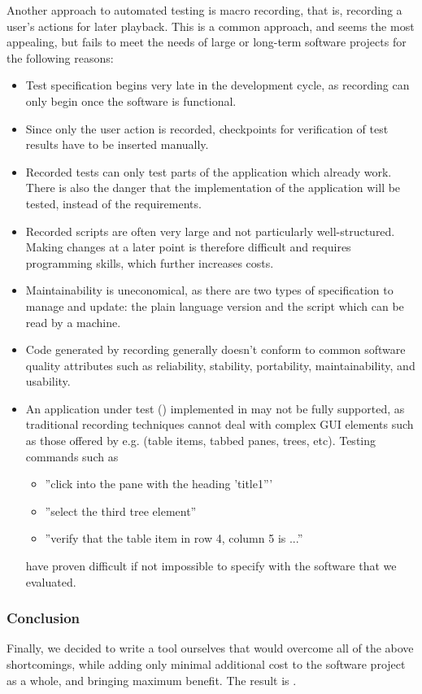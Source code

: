 Another approach to automated testing is macro recording, that is, 
recording a user's actions for later playback.
This is a common approach, and seems the most appealing,
 but fails to meet the needs of large or long-term software projects 
for the following reasons:
\begin{itemize}
\item Test specification begins very late in the development cycle,
 as recording can only begin once the software is functional. 
\item Since only the user action is recorded, checkpoints for verification
of test results have to be inserted manually.
\item Recorded tests can only test parts of the application which already work. There is also the danger that the implementation of the application will be tested, instead of the requirements. 
\item Recorded scripts are often very large and not particularly 
well-structured. Making changes at a later point is therefore 
difficult and requires programming skills, which further increases costs. 
\item Maintainability is uneconomical, as there are two types of specification
to manage and update: the plain language version and the script which can be 
read by a machine. 
\item Code generated by recording generally doesn't conform to
 common software quality attributes such as reliability, stability, 
portability, maintainability, and usability.
\item An application under test (\gdaut) implemented in  may not be fully supported, as
traditional recording techniques cannot deal with complex
 GUI elements such as those offered 
by e.g.  (table items, tabbed panes, trees, etc). Testing commands such as
  \begin{itemize}
    \item{''click into the pane with the heading 'title1'''}
    \item{''select the third tree element''}
    \item{''verify that the table item in row 4, column 5 is ...''}
  \end{itemize}
have proven difficult if not impossible to specify with the software that we evaluated.
\end{itemize}

\subsubsection{Conclusion}

Finally, we decided to write a tool ourselves that would overcome all
of the above shortcomings, while adding only minimal additional cost to 
the software project as a whole, and bringing maximum benefit. The result is \jb{}{}.  
